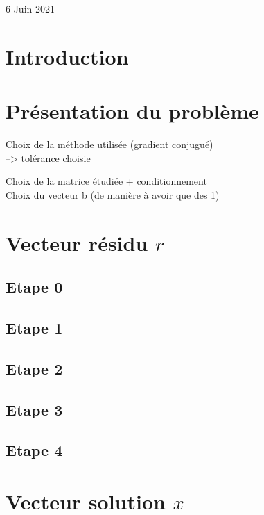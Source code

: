 \documentclass[12,french]{report}
\begin{document}
\begin{titlepage}
\begin{center}
	\vfill
	{\large 6 Juin 2021}
\end{center}
\end{titlepage}

\tableofcontents


\renewcommand{\chaptername}{}
\chapter*{Introduction} %

\chapter{Présentation du problème} %

Choix de la méthode utilisée (gradient conjugué)\\
--> tolérance choisie

Choix de la matrice étudiée + conditionnement \\
Choix du vecteur b (de manière à avoir que des 1)




\chapter{Vecteur résidu $r$} %

\section{Etape 0}

\section{Etape 1}

\section{Etape 2}

\section{Etape 3}

\section{Etape 4}

\chapter{Vecteur solution $x$} %
\end{document}

